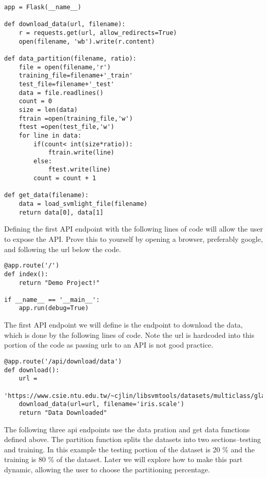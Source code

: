 \begin{lstlisting}
app = Flask(__name__)

def download_data(url, filename):
    r = requests.get(url, allow_redirects=True)
    open(filename, 'wb').write(r.content)

def data_partition(filename, ratio):
    file = open(filename,'r')
    training_file=filename+'_train'
    test_file=filename+'_test'
    data = file.readlines()
    count = 0
    size = len(data)
    ftrain =open(training_file,'w')
    ftest =open(test_file,'w')
    for line in data:
        if(count< int(size*ratio)):
            ftrain.write(line)
        else:
            ftest.write(line)
        count = count + 1        

def get_data(filename):
    data = load_svmlight_file(filename)
    return data[0], data[1]
\end{lstlisting} 

Defining the first API endpoint with the following lines of code will
allow the user to expose the API. Prove this to yourself by opening a
browser, preferably google, and following the url below the code.

\begin{lstlisting}
@app.route('/')
def index():
    return "Demo Project!"

if __name__ == '__main__':
    app.run(debug=True)
\end{lstlisting} 


The first API endpoint we will define is the endpoint to download the
data, which is done by the following lines of code. Note the url is
hardcoded into this portion of the code as passing urls to an API is
not good practice.  

\begin{lstlisting}
@app.route('/api/download/data')
def download():
    url =
    'https://www.csie.ntu.edu.tw/~cjlin/libsvmtools/datasets/multiclass/glass.scale'
    download_data(url=url, filename='iris.scale')
    return "Data Downloaded"
\end{lstlisting} 

The following three api endpoints use the data pration and get data
functions defined above. The partition function splits the datasets
into two sections--testing and training. In this example the testing
portion of the dataset is 20 \% and the training is 80 \% of the
dataset. Later we will explore how to make this part dynamic, allowing
the user to choose the partitioning percentage. 

